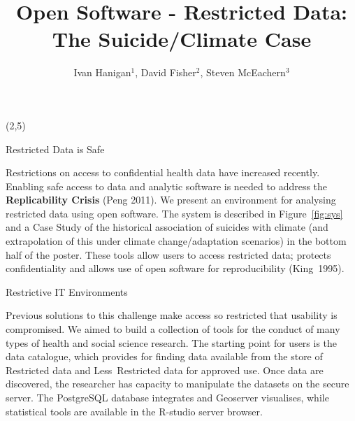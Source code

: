 \documentclass[final]{beamer}
\title{Open Software - Restricted Data: The Suicide/Climate Case}
\author{Ivan Hanigan$^1$, David Fisher$^2$, Steven McEachern$^3$}
\date{}
\begin{document}

\begin{frame}{} 

\begin{textblock}{17}(2,5)
\begin{block}{Restricted Data is Safe}
\begin{scriptsize}
Restrictions on access to confidential health data have increased recently. Enabling safe access to data and analytic software is needed to address the {\color{red}\textbf{Replicability Crisis}} (Peng 2011).  We present an environment for analysing restricted data using open software. The system is described in Figure~\ref{fig:sys} and a Case Study of the historical association of suicides with climate (and extrapolation of this under climate change/adaptation scenarios) in the bottom half of the poster. These tools allow users to access restricted data; protects confidentiality and allows use of open software for reproducibility (King~1995).  
\end{scriptsize}
\end{block}

\begin{block}{Restrictive IT Environments}
\begin{scriptsize}
Previous solutions to this challenge make access so restricted that usability is compromised. We aimed to build a collection of tools for the conduct of many types of health and social science research. The starting point for users is the data catalogue, which provides for finding data available from the store of {\color{red} Restricted data} and {\color{blue}Less~Restricted data}  for approved use. Once data are discovered, the researcher has capacity to manipulate the datasets on the secure server. The PostgreSQL database integrates and Geoserver visualises, while statistical tools are available in the R-studio server browser.
\end{scriptsize}  

\end{block}
\end{textblock}


\end{frame}
\end{document}
